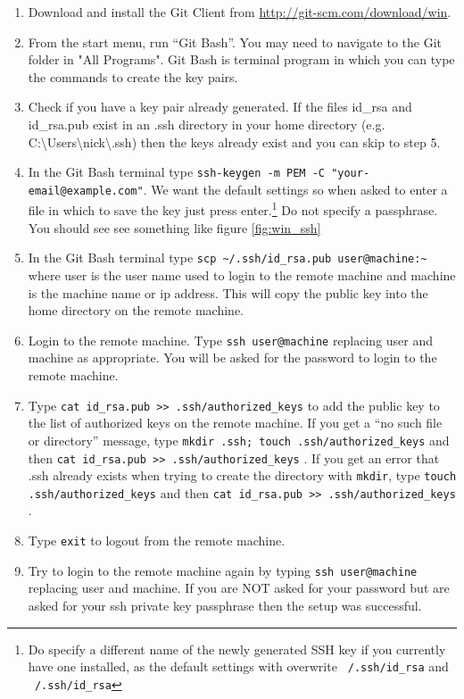 \documentclass[11pt]{amsart}
\begin{document}
\begin{enumerate}
\item Download and install the Git Client from \href{http://git-scm.com/download/win}{http://git-scm.com/download/win}.
\item From the start menu, run ``Git Bash''. You may need to navigate to the Git folder in "All Programs". Git Bash is terminal program in which you can type the commands to create the key pairs.
\item Check if you have a key pair already generated. If the files id\_rsa and id\_rsa.pub exist in an .ssh directory in your home directory (e.g. C:\textbackslash Users\textbackslash nick\textbackslash .ssh) then the keys already exist and you can skip to step 5.
\item In the Git Bash terminal type {\tt ssh-keygen -m PEM -C "your-email@example.com"}. We want the default settings so when asked to enter a file in which to save the key just press enter.\footnote{Do specify a different name of the newly generated SSH key if you currently have one installed, as the default settings with overwrite {\tt~/.ssh/id\_rsa} and {\tt~/.ssh/id\_rsa}} Do not specify a passphrase. You should see see something like figure \ref{fig:win_ssh}
\item In the Git Bash terminal type {\tt scp \textasciitilde/.ssh/id\_rsa.pub user@machine:\textasciitilde} where user is the user name used to login to the remote machine and machine is the machine name or ip address. This will copy the public key into the home directory on the remote machine.
\item Login to the remote machine. Type {\tt ssh user@machine} replacing user and machine as appropriate. You will be asked for the password to login to the remote machine.
\item Type {\tt cat id\_rsa.pub >> .ssh/authorized\_keys} to add the public key to the list of authorized keys on the remote machine. If you get a ``no such file or directory'' message, type {\tt mkdir .ssh; touch .ssh/authorized\_keys} and then  {\tt cat id\_rsa.pub >> .ssh/authorized\_keys} . If you get an error that .ssh already exists when trying to create the directory with {\tt mkdir}, type {\tt touch .ssh/authorized\_keys} and then  {\tt cat id\_rsa.pub >> .ssh/authorized\_keys} .
\item Type {\tt exit} to logout from the remote machine.
\item Try to login to the remote machine again by typing {\tt ssh user@machine} replacing user and machine. If you are NOT asked for your password but are asked for your ssh private key passphrase then the setup was successful.
\end{enumerate}
\end{document}
